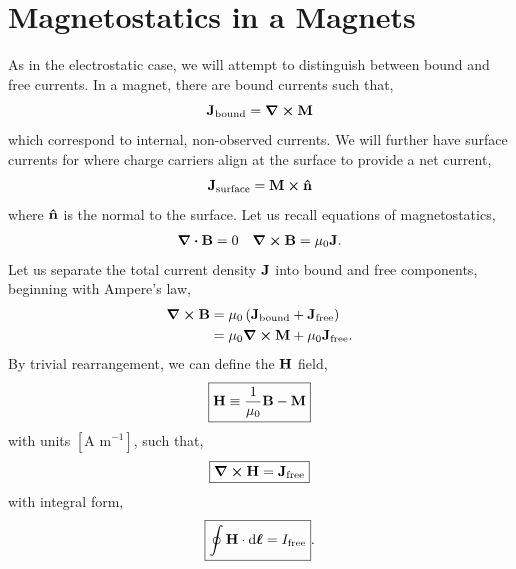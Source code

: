 \documentclass{book}
\begin{document}
\section{Magnetostatics in a Magnets}
As in the electrostatic case, we will attempt to distinguish between bound and free currents. In a magnet, there are bound currents such that,
\begin{equation}
	\vb{J}_{\text{bound}} = \curl{\vb{M}}
\end{equation}
which correspond to internal, non-observed currents. We will further have surface currents for where charge carriers align at the surface to provide a net current,
\begin{equation}
	\vb{J}_{\text{surface}} = \vb{M} \cross \vu{n}
\end{equation}
where $\vu{n}$ is the normal to the surface. Let us recall equations of magnetostatics,
\begin{align*}
	\div{\vb{B}} = 0 && \curl{\vb{B}} = \mu_0 \vb{J}.
\end{align*}
Let us separate the total current density $\vb{J}$ into bound and free components, beginning with Ampere's law,
\begin{equation}
	\begin{split}
		\curl{\vb{B}} & = \mu_0\left(\vb{J}_{\text{bound}} + \vb{J}_{\text{free}}\right) \\
		& = \mu_0\curl{\vb{M}} + \mu_0\vb{J}_{\text{free}}.
	\end{split}
\end{equation}
By trivial rearrangement, we can define the $\vb{H}$ field,
\begin{equation}
	\boxed{\vb{H} \equiv \frac{1}{\mu_0}\vb{B} - \vb{M}}
\end{equation}
with units $\left[\text{A m}^{-1}\right]$, such that,
\begin{equation}
	\boxed{\curl{\vb{H}} = \vb{J}_{\text{free}}}
\end{equation}
with integral form,
\begin{equation}
	\boxed{\oint\vb{H} \cdot \dd{\vb*{\ell}} = I_{\text{free}}}.
\end{equation}
\end{document}
